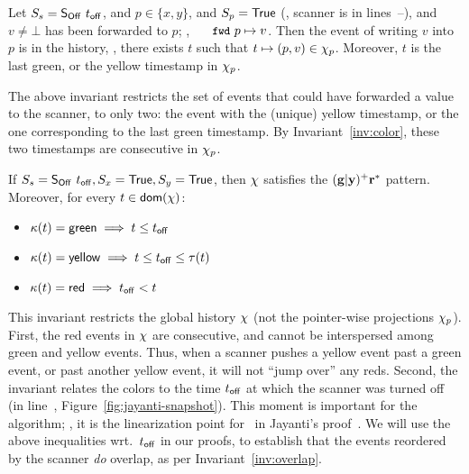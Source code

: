 \begin{invariant}\label{inv:readFP}%
Let $S_s= \mathsf{S_{Off}}\ t_{\mathsf{off}}$, and $p \in \{x, y\}$, and $S_p = \mathsf{True}$ (\ie,
scanner is in lines~\lineScanReadsFX--\lineScanReadsFY), and $v \neq \bot$ has been forwarded to
$p$; \ie, $\aleksfwdp{p} \hpts v$. Then the event of writing $v$ into
$p$ is in the history, \ie, there exists $t$ such that $t \mapsto (p, v)
\in \chi_p$. Moreover, $t$ is the last green, or the yellow timestamp
in $\chi_p$.
\end{invariant}

The above invariant restricts the set of events that could have
forwarded a value to the scanner, to only two: the event with the
(unique) yellow timestamp, or the one corresponding to the last green
timestamp. By Invariant~\ref{inv:color}, these two timestamps are
consecutive in $\chi_p$.

\vspace{10pt}

\begin{invariant}\label{inv:redzone}%
If $S_s = \mathsf{S_{Off}}\ t_{\mathsf{off}}, S_x = \mathsf{True}, S_y = \mathsf{True}$, then $\chi$ satisfies
the ${\mathbf{{{(g | y)^{+}}}{r^{*}}}}$ pattern. Moreover, for every $t \in \mathsf{dom}(\chi)$:
%
\begin{itemize}
\item $\kappa(t) = \mathsf{green} \implies t \leq t_{\mathsf{off}}$
\item $\kappa(t) = \mathsf{yellow} \implies t \leq t_{\mathsf{off}} \leq \tau (t)$
\item $\kappa(t) = \mathsf{red} \implies t_{\mathsf{off}} < t$  
\end{itemize}
\end{invariant}

This invariant restricts the global history $\chi$ (not the
pointer-wise projections $\chi_p$). First, the red events in $\chi$
are consecutive, and cannot be interspersed among green and yellow
events. Thus, when a scanner pushes a yellow event past a green event,
or past another yellow event, it will not ``jump over'' any
reds. Second, the invariant relates the colors to the time $t_{\mathsf{off}}$ at
which the scanner was turned off (in line~\lineScanUnsetsS,
Figure~\ref{fig:jayanti-snapshot}). This moment is important for the
algorithm; \eg, it is the linearization point for \jyscan~in
Jayanti's proof~\cite{Jayanti+STOC05}.
%
We will use the above inequalities wrt.~$t_{\mathsf{off}}$ in our proofs, to
establish that the events reordered by the scanner \emph{do} overlap,
as per Invariant~\ref{inv:overlap}.


